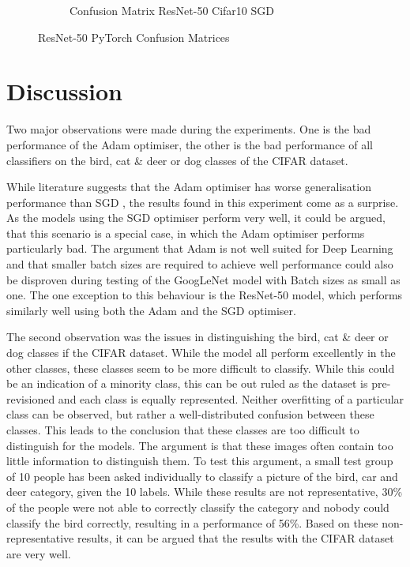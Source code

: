 \documentclass[conference]{IEEEtran}
\begin{document}
\begin{figure}[!htbp]
\begin{subfigure}[b]{0.22\textwidth}
        \caption{Confusion Matrix ResNet-50 Cifar10 SGD}
        \label{fig:x matrix_ResNet_CIFAR_SGD}
    \end{subfigure}
    \caption{ResNet-50 PyTorch Confusion Matrices}
    \label{fig: ResNet Confusion Matrixis}
\end{figure}

\section{Discussion}\label{C5}
Two major observations were made during the experiments. 
One is the bad performance of the Adam optimiser, the other is the bad performance of all classifiers on the bird, cat \& deer or dog classes of the CIFAR dataset.

While literature suggests that the Adam optimiser has worse generalisation performance than SGD \cite{gupta_adam_nodate}, the results found in this experiment come as a surprise.
As the models using the SGD optimiser perform very well, it could be argued, that this scenario is a special case, in which the Adam optimiser performs particularly bad.
The argument that Adam is not well suited for Deep Learning and that smaller batch sizes are required to achieve well performance could also be disproven during testing of the GoogLeNet model with Batch sizes as small as one.
The one exception to this behaviour is the ResNet-50 model, which performs similarly well using both the Adam and the SGD optimiser.

The second observation was the issues in distinguishing the bird, cat \& deer or dog classes if the CIFAR dataset. 
While the model all perform excellently in the other classes, these classes seem to be more difficult to classify.
While this could be an indication of a minority class, this can be out ruled as the dataset is pre-revisioned and each class is equally represented.
Neither overfitting of a particular class can be observed, but rather a well-distributed confusion between these classes.
This leads to the conclusion that these classes are too difficult to distinguish for the models. 
The argument is that these images often contain too little information to distinguish them. 
To test this argument, a small test group of 10 people has been asked individually to classify a picture of the bird, car and deer category, given the 10 labels.
While these results are not representative, 30\% of the people were not able to correctly classify the category and nobody could classify the bird correctly, resulting in a performance of 56\%.
Based on these non-representative results, it can be argued that the results with the CIFAR dataset are very well.
\end{document}
